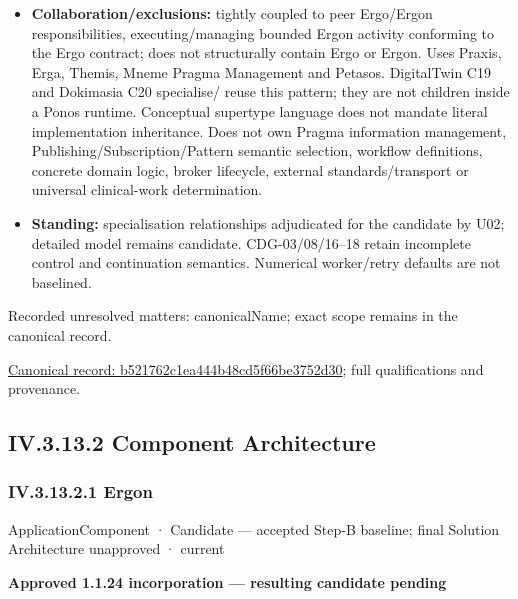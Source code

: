 \begin{itemize}
\item \textbf{Collaboration/exclusions:} tightly coupled to peer Ergo/Ergon responsibilities,
  executing/managing bounded Ergon activity conforming to the Ergo contract;
  does not structurally contain Ergo or Ergon. Uses Praxis, Erga, Themis, Mneme
  Pragma Management and Petasos. DigitalTwin C19 and Dokimasia C20 specialise/
  reuse this pattern; they are not children inside a Ponos runtime. Conceptual
  supertype language does not mandate literal implementation inheritance.
  Does not own Pragma information management, Publishing/Subscription/Pattern
  semantic selection, workflow definitions, concrete domain logic, broker lifecycle,
  external standards/transport or universal clinical-work determination.

\item \textbf{Standing:} specialisation relationships adjudicated for the candidate by U02;
  detailed model remains candidate. CDG-03/08/16–18 retain incomplete control
  and continuation semantics. Numerical worker/retry defaults are not baselined.

\end{itemize}

{\small Recorded unresolved matters: canonicalName; exact scope remains in the canonical record.}\par
{\footnotesize \href{../../../../continuum/application/application-component/b521762c1ea444b48cd5f66be3752d30.md}{Canonical record: b521762c1ea444b48cd5f66be3752d30}; full qualifications and provenance.}\par
\subsection*{IV.3.13.2 Component Architecture}
\label{navigation:IV.3.13.2}

\subsubsection*{IV.3.13.2.1 Ergon}
\label{navigation:IV.3.13.2.1}

\label{element:49c9eb2bef0c47b8b5328621d5fc5479}
{\small ApplicationComponent · Candidate — accepted Step-B baseline; final Solution Architecture unapproved · current}\par

\par\medskip\textbf{Approved 1.1.24 incorporation — resulting candidate pending}\par


